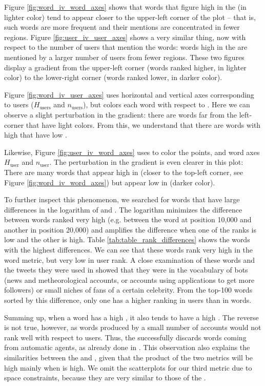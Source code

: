 Figure \ref{fig:word_iv_word_axes} shows that words that figure high in the \wordrank{} (in lighter color) tend to appear closer to the upper-left corner of the plot -- that is, such words are more frequent and their mentions are concentrated in fewer regions. Figure \ref{fig:user_iv_user_axes} shows a very similar thing, now with respect to the number of users that mention the words: words high in the \userrank{} are mentioned by a larger number of users from fewer regions.
These two figures display a gradient from the upper-left corner (words ranked higher, in lighter color) to the lower-right corner (words ranked lower, in darker color). 

Figure \ref{fig:word_iv_user_axes} uses horizontal and vertical axes corresponding to users ($H_\text{users}$ and $n_\text{users}$), but colors each word with respect to \wordrank{}. Here we can observe a slight perturbation in the gradient: there are words far from the left-corner that have light colors. From this, we understand that there are words with high \wordrank{} that have low \userrank{}. 

Likewise, Figure \ref{fig:user_iv_word_axes} uses \userrank{} to color the points, and word axes $H_\text{user}$ and $n_\text{user}$. The perturbation in the gradient is even clearer in this plot: There are many words that appear high in \wordrank{} (closer to the top-left corner, see Figure  \ref{fig:word_iv_word_axes}) but appear low in \userrank{} (darker color). 


To further inspect this phenomenon, we searched for words that have large differences in the logarithm of \wordrank{} and \userrank{}. The logarithm minimizes the difference between words ranked very high (e.g. between the word at position 10,000 and another in position 20,000) and amplifies the difference when one of the ranks is low and the other is high. Table \ref{tab:table_rank_differences} shows the words with the highest differences. We can see that these words rank very high in the word metric, but very low in user rank. A close examination of these words and the tweets they were used in showed that they were in the vocabulary of bots (news and metheorological accounts, or accounts using applications to get more followers) or small niches of fans of a certain celebrity. From the top-100 words sorted by this difference, only one has a higher ranking in users than in words. 

Summing up, when a word has a high \userrank{}, it also tends to have a high \wordrank{}. The reverse is not true, however, as words produced by a small number of accounts would not rank well with respect to users. Thus, the  \userrank{} successfully discards words coming from automatic agents, as already done in \citet{Cui:2012:DBE:2396761.2398519}. This observation also explains the similarities between the \mixedrank{} and \userrank{}, given that the product of the two metrics will be high mainly when \userrank{} is high. We omit the scatterplots for our third metric due to space constraints, because they are very similar to those of the \userrank{}.

